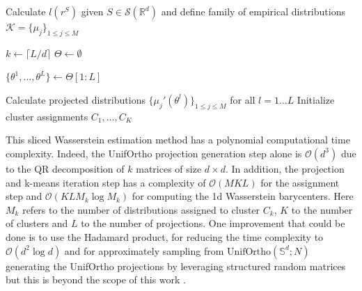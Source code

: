 \documentclass[12pt,a4paper]{report}
\begin{document}
\begin{algorithm}[H]
\caption{sWk-means clustering with UnifOrtho Projections}\label{alg:swkmeans}


\BlankLine

Calculate $l(r^S)$ given $S \in \mathcal{S}(\mathbb{R}^d)$ and define family of empirical distributions $\mathcal{K} = \{\mu_j\}_{1 \le j \le M}$\;

\BlankLine
{}
$k \leftarrow \lceil L/d \rceil$ 
$\Theta \leftarrow \emptyset$\;

$\{\theta^1, \dots, \theta^L\} \leftarrow \Theta[1:L]$ 

\BlankLine
{}
Calculate projected distributions $\{\mu_j'(\theta^l)\}_{1 \le j \le M}$ for all $l=1 \dots L$\;
Initialize cluster assignments $C_1, \dots, C_K$\;


\end{algorithm}
This sliced Wasserstein estimation method has a polynomial computational time complexity.
Indeed, the UnifOrtho projection generation step alone is $\mathcal{O}(d^3)$ due to the QR decomposition of $k$ matrices of size $d \times d$. 
In addition, the projection and k-means iteration step has a complexity of $\mathcal{O}(M K L)$ for the assignment step and $\mathcal{O}(K L M_k \log M_k)$ for computing the 1d Wasserstein barycenters.
Here $M_k$ refers to the number of distributions assigned to cluster $C_k$, $K$ to the number of clusters and $L$ to the number of projections.
One improvement that could be done is to use the Hadamard product, for reducing the time complexity to $\mathcal{O}(d^2 \log d)$ and for approximately sampling from $\text{UnifOrtho}(\mathbb{S}^d;N)$ generating the UnifOrtho projections by leveraging structured random matrices but this is beyond the scope of this work \cite{ChoromanskiEtAl2019}.
\end{document}
